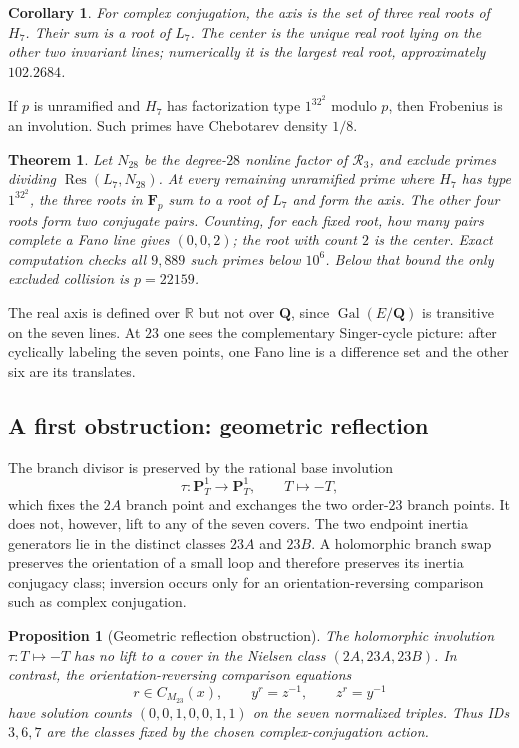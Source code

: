 \documentclass[11pt]{amsart}
\newtheorem{theorem}{Theorem}[section]
\newtheorem{proposition}[proposition]{Proposition}
\newtheorem{corollary}[corollary]{Corollary}
\theoremstyle{definition}
\theoremstyle{remark}
\newcommand{\QQ}{\mathbf Q}
\newcommand{\FF}{\mathbf F}
\newcommand{\PP}{\mathbf P}
\newcommand{\Gal}{\operatorname{Gal}}
\newcommand{\Res}{\operatorname{Res}}
\begin{document}
\begin{corollary}\label{cor:archimedean}
For complex conjugation, the axis is the set of three real roots of $H_7$.
Their sum is a root of $L_7$.  The center is the unique real root lying on
the other two invariant lines; numerically it is the largest real root,
approximately $102.2684$.
\end{corollary}

If $p$ is unramified and $H_7$ has factorization type $1^32^2$ modulo $p$,
then Frobenius is an involution.  Such primes have Chebotarev density $1/8$.

\begin{theorem}\label{thm:transvection-primes}
Let $N_{28}$ be the degree-$28$ nonline factor of $\mathcal R_3$, and
exclude primes dividing $\Res(L_7,N_{28})$.  At every remaining unramified
prime where $H_7$ has type $1^32^2$, the three roots in $\FF_p$ sum to a
root of $L_7$ and form the axis.  The other four roots form two conjugate
pairs.  Counting, for each fixed root, how many pairs complete a Fano line
gives $(0,0,2)$; the root with count $2$ is the center.  Exact computation
checks all $9{,}889$ such primes below $10^6$.  Below that bound the only
excluded collision is $p=22159$.
\end{theorem}

The real axis is defined over $\mathbb R$ but not over $\QQ$, since
$\Gal(E/\QQ)$ is transitive on the seven lines.  At $23$ one sees the
complementary Singer-cycle picture: after cyclically labeling the seven
points, one Fano line is a difference set and the other six are its
translates.

\subsection{A first obstruction: geometric reflection}
\label{sec:complex-conjugation}

The branch divisor is preserved by the rational base involution
\[
 \tau:\PP^1_T\longrightarrow\PP^1_T,\qquad T\longmapsto-T,
\]
which fixes the $2A$ branch point and exchanges the two order-$23$ branch
points.  It does not, however, lift to any of the seven covers.  The two
endpoint inertia generators lie in the distinct classes $23A$ and $23B$.
A holomorphic branch swap preserves the orientation of a small loop and
therefore preserves its inertia conjugacy class; inversion occurs only for
an orientation-reversing comparison such as complex conjugation.

\begin{proposition}[Geometric reflection obstruction]
\label{prop:arithmetic-reflection}
The holomorphic involution $\tau:T\mapsto-T$ has no lift to a cover in the
Nielsen class $(2A,23A,23B)$.  In contrast, the orientation-reversing
comparison equations
\[
 r\in C_{M_{23}}(x),\qquad
 y^r=z^{-1},\qquad z^r=y^{-1}
\]
have solution counts $(0,0,1,0,0,1,1)$ on the seven normalized triples.
Thus IDs $3,6,7$ are the classes fixed by the chosen complex-conjugation
action.
\end{proposition}
\end{document}
